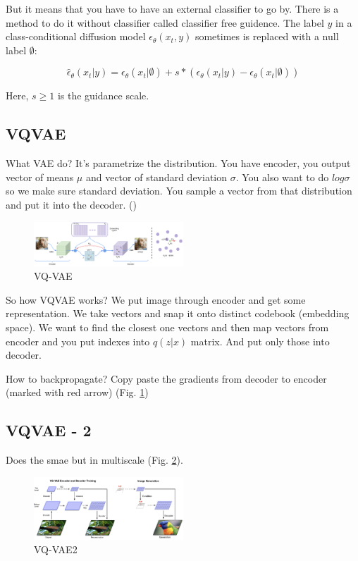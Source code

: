 But it means that you have to have an external classifier to go by. There is a method to do it without classifier called classifier free guidence.
The label $y$ in a class-conditional diffusion model $\epsilon_\theta(x_t, y)$ sometimes is replaced with a null label $\emptyset$:

$$\hat{\epsilon}_\theta(x_t|y) = \epsilon_\theta(x_t|\emptyset) + s * (\epsilon_\theta(x_t|y) - \epsilon_\theta(x_t|\emptyset))$$

Here, $s\geq1$ is the guidance scale.

\subsection{VQVAE}
What VAE do? It's parametrize the distribution. You have encoder, you output vector of means $\mu$ and vector of standard deviation $\sigma$.
You also want to do $log \sigma$ so we make sure standard deviation.
You sample a vector from that distribution and put it into the decoder. (\cite{oord2017neural})

\begin{figure}[h]
    \centering
    \includegraphics[width=0.5\textwidth]{images/vqvae.png}
    \caption{VQ-VAE}
    \label{fig:vq_vae}
\end{figure}

So how VQVAE works? We put image through encoder and get some representation. We take vectors and snap it onto distinct codebook (embedding space).
We want to find the closest one vectors and then map vectors from encoder and you put indexes into $q(z|x)$ matrix. And put only those into decoder.

How to backpropagate? Copy paste the gradients from decoder to encoder (marked with red arrow) (Fig. \ref{fig:vq_vae})

\subsection{VQVAE - 2}
Does the smae but in multiscale (Fig. \ref{fig:vq_vae2}).
\begin{figure}[h!]
    \centering
    \includegraphics[width=0.5\textwidth]{images/vqvae2.png}
    \caption{VQ-VAE2}
    \label{fig:vq_vae2}
\end{figure}


